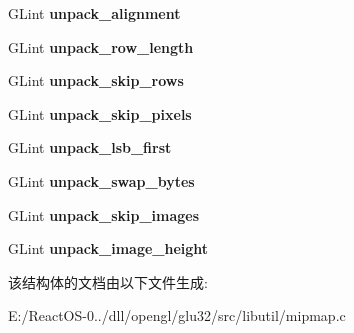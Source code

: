 \begin{DoxyCompactItemize}
G\+Lint {\bfseries unpack\+\_\+alignment}
\item 
\mbox{\label{struct_pixel_storage_modes_a7f22fead9ad7f12b3b1f670cc90cb97b}} 
G\+Lint {\bfseries unpack\+\_\+row\+\_\+length}
\item 
\mbox{\label{struct_pixel_storage_modes_a24317359db1e64dfd7676eccaec6a9bc}} 
G\+Lint {\bfseries unpack\+\_\+skip\+\_\+rows}
\item 
\mbox{\label{struct_pixel_storage_modes_a0953b0afdae95b22eceec63ae703b352}} 
G\+Lint {\bfseries unpack\+\_\+skip\+\_\+pixels}
\item 
\mbox{\label{struct_pixel_storage_modes_a8188eeed18a879699d479ef8f360edf1}} 
G\+Lint {\bfseries unpack\+\_\+lsb\+\_\+first}
\item 
\mbox{\label{struct_pixel_storage_modes_ae46cf20ee031c8830afbbfc6c65ce317}} 
G\+Lint {\bfseries unpack\+\_\+swap\+\_\+bytes}
\item 
\mbox{\label{struct_pixel_storage_modes_ab27151bdf11b5b4ca068adc233595191}} 
G\+Lint {\bfseries unpack\+\_\+skip\+\_\+images}
\item 
\mbox{\label{struct_pixel_storage_modes_aef38182b300d9b59d2b7ce519894c999}} 
G\+Lint {\bfseries unpack\+\_\+image\+\_\+height}
\end{DoxyCompactItemize}


该结构体的文档由以下文件生成\+:\begin{DoxyCompactItemize}
\item 
E\+:/\+React\+O\+S-\/0../dll/opengl/glu32/src/libutil/mipmap.\+c\end{DoxyCompactItemize}
